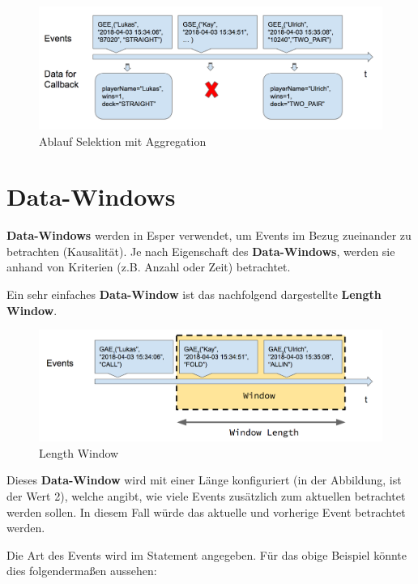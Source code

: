 \begin{figure}[ht]
	\centering
	\includegraphics[width=\textwidth,height=\textheight, keepaspectratio]{images/statement_basic_aggregation.png}
	\caption{Ablauf Selektion mit Aggregation}
	\label{aggregation_select_img}
\end{figure}

\section{Data-Windows}
\label{Data-Windows}

\textbf{Data-Windows} werden in Esper verwendet, um Events im Bezug zueinander zu betrachten (Kausalität). Je nach Eigenschaft des \textbf{Data-Windows}, werden sie anhand von Kriterien (z.B. Anzahl oder Zeit) betrachtet.

Ein sehr einfaches \textbf{Data-Window} ist das nachfolgend dargestellte \textbf{Length Window}.

\begin{figure}[ht]
	\centering
	\includegraphics[width=\textwidth,height=\textheight,keepaspectratio]{images/data_window_length.png}
	\caption{Length Window}
	\label{LengthWindow}
\end{figure}

Dieses \textbf{Data-Window} wird mit einer Länge konfiguriert (in der Abbildung, ist der Wert 2), welche angibt, wie viele Events zusätzlich zum aktuellen betrachtet werden sollen. In diesem Fall würde das aktuelle und vorherige Event betrachtet werden.

Die Art des Events wird im Statement angegeben. Für das obige Beispiel könnte dies folgendermaßen aussehen:

